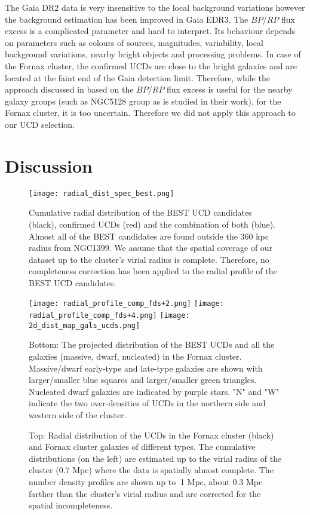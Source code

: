 \documentclass[fleqn,usenatbib]{mnras}
\begin{document}
The Gaia DR2 data is very insensitive to the local background variations however the background estimation has been improved in Gaia EDR3. The $BP$/$RP$ flux excess is a complicated parameter and hard to interpret. Its behaviour depends on parameters such as colours of sources, magnitudes, variability, local background variations, nearby bright objects and processing problems. In case of the Fornax cluster, the confirmed UCDs are close to the bright galaxies and are located at the faint end of the Gaia detection limit. Therefore, while the approach discussed in \citet{voggel2020} based on the $BP$/$RP$ flux excess is useful for the nearby galaxy groups (such as NGC5128 group as is studied in their work), for the Fornax cluster, it is too uncertain. Therefore we did not apply this approach to our UCD selection.

\section{Discussion}
\label{sec6}

\begin{figure}
\texttt{[image: radial\_dist\_spec\_best.png]}
\caption{Cumulative radial distribution of the BEST UCD candidates (black), confirmed UCDs (red) and the combination of both (blue). Almost all of the BEST candidates are found outside the 360 kpc radius from NGC1399. We assume that the spatial coverage of our dataset up to the cluster's virial radius is complete. Therefore, no completeness correction has been applied to the radial profile of the BEST UCD candidates.}
\label{radial}
\end{figure}

\begin{figure*}
\texttt{[image: radial\_profile\_comp\_fds+2.png]}
\texttt{[image: radial\_profile\_comp\_fds+4.png]}
\texttt{[image: 2d\_dist\_map\_gals\_ucds.png]}
\caption{Top: Radial distribution of the UCDs in the Fornax cluster (black) and Fornax cluster galaxies of different types. The cumulative distributions (on the left) are estimated up to the virial radius of the cluster (0.7 Mpc) where the data is spatially almost complete. The number density profiles are shown up to $~$1 Mpc, about 0.3 Mpc farther than the cluster's virial radius and are corrected for the spatial incompleteness.} Bottom: The projected distribution of the BEST UCDs and all the galaxies (massive, dwarf, nucleated) in the Fornax cluster. Massive/dwarf early-type and late-type galaxies are shown with larger/smaller blue squares and larger/smaller green triangles. Nucleated dwarf galaxies are indicated by purple stars. "N" and "W" indicate the two over-densities of UCDs in the northern side and western side of the cluster.
\label{radial2}
\end{figure*}
\end{document}
